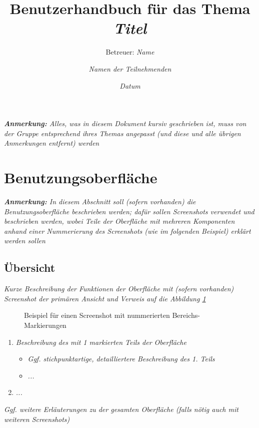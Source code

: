 \documentclass[a4paper,10pt]{scrartcl}
\title{Benutzerhandbuch für das Thema \glqq\textit{Titel}\grqq}
\subtitle{Betreuer: \textit{Name}}
\author{\textit{Namen der Teilnehmenden}}
\date{\textit{Datum}}
\begin{document}
\maketitle

\textit{\textbf{Anmerkung:} Alles, was in diesem Dokument kursiv geschrieben ist, muss von der Gruppe entsprechend ihres Themas angepasst (und diese und alle übrigen Anmerkungen entfernt) werden}

\tableofcontents

\newpage

\section{Benutzungsoberfläche}

\textit{\textbf{Anmerkung:} In diesem Abschnitt soll (sofern vorhanden) die Benutzungsoberfläche beschrieben werden; dafür sollen Screenshots verwendet und beschrieben werden, wobei Teile der Oberfläche mit mehreren Komponenten anhand einer Nummerierung des Screenshots (wie im folgenden Beispiel) erklärt werden sollen}

\subsection{Übersicht}

\textit{Kurze Beschreibung der Funktionen der Oberfläche mit (sofern vorhanden) Screenshot der primären Ansicht und Verweis auf die Abbildung \ref{sample-screenshot}}

\begin{figure}[h]
\caption{Beispiel für einen Screenshot mit nummerierten Bereichs-Markierungen}
\label{sample-screenshot}
\end{figure}

\begin{enumerate}
    \item \textit{Beschreibung des mit 1 markierten Teils der Oberfläche}
    \begin{itemize}
        \item \textit{Ggf. stichpunktartige, detailliertere Beschreibung des 1. Teils}
        \item \textit{...}
    \end{itemize}
    \item \textit{...}
\end{enumerate}

\textit{Ggf. weitere Erläuterungen zu der gesamten Oberfläche (falls nötig auch mit weiteren Screenshots)}
\end{document}
